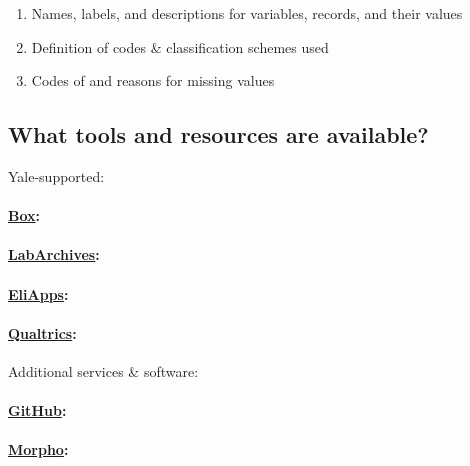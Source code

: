 \documentclass{tufte-handout}
\begin{document}
\begin{enumerate}
\def\labelenumi{\arabic{enumi}.}
\itemsep1pt\parskip0pt
\item
  Names, labels, and descriptions for variables, records, and their
  values
\item
  Definition of codes \& classification schemes used
\item
  Codes of and reasons for missing values
\end{enumerate}

\subsection{What tools and resources are
available?}\label{what-tools-and-resources-are-available-1}

Yale-supported:

\paragraph{\href{http://its.yale.edu/services/collaboration-and-file-sharing/box-yale}{Box}:}\label{box}

\paragraph{\href{http://its.yale.edu/services/research-technologies/elab-notebook/labarchives-faqs}{LabArchives}:}\label{labarchives}

\paragraph{\href{http://its.yale.edu/services/email-and-calendars/eliapps-google-apps-education}{EliApps}:}\label{eliapps}

\paragraph{\href{http://its.yale.edu/services/web-and-application-services/qualtrics-survey-tool}{Qualtrics}:}\label{qualtrics}

Additional services \& software:

\paragraph{\href{https://github.com/}{GitHub}:}\label{github}

\paragraph{\href{https://knb.ecoinformatics.org/morphoportal.jsp}{Morpho}:}\label{morpho}
\end{document}
